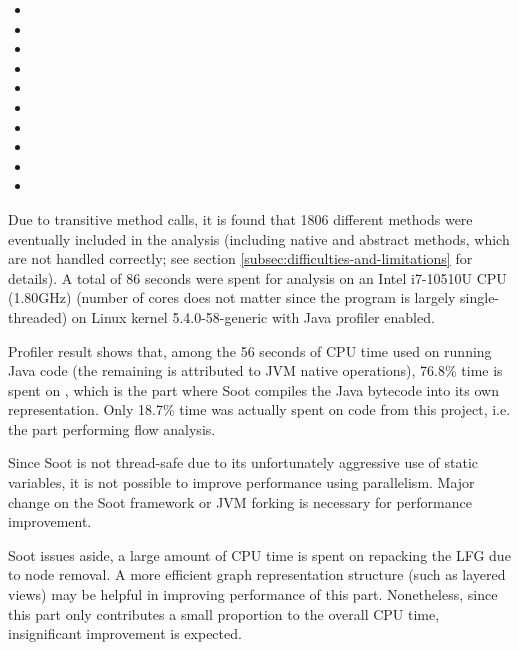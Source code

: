 \begin{itemize}
  \item {}
  \item {}
  \item {}
  \item {}
  \item {}
  \item {}
  \item {}
  \item {}
  \item {}
  \item {}
\end{itemize}

Due to transitive method calls,
it is found that 1806 different methods were eventually included in the analysis
(including native and abstract methods, which are not handled correctly;
see section \ref{subsec:difficulties-and-limitations} for details).
A total of 86 seconds were spent for analysis on an Intel i7-10510U CPU (1.80GHz)
(number of cores does not matter since the program is largely single-threaded)
on Linux kernel 5.4.0-58-generic with Java profiler enabled.

Profiler result shows that, among the 56 seconds of CPU time used on running Java code
(the remaining is attributed to JVM native operations),
76.8\% time is spent on ,
which is the part where Soot compiles the Java bytecode into its own representation.
Only 18.7\% time was actually spent on code from this project,
i.e. the part performing flow analysis.

Since Soot is not thread-safe due to its unfortunately aggressive use of static variables,
it is not possible to improve performance using parallelism.
Major change on the Soot framework or \ac{JVM} forking is necessary
for performance improvement.

Soot issues aside,
a large amount of CPU time is spent
on repacking the \ac{LFG} due to node removal.
A more efficient graph representation structure (such as layered views)
may be helpful in improving performance of this part.
Nonetheless, since this part only contributes a small proportion to the overall CPU time,
insignificant improvement is expected.

